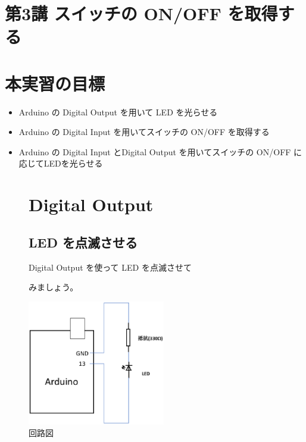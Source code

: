 \documentclass[11pt,a4paper]{jarticle}
\begin{document}
\section*{\LARGE{第3講 スイッチの ON/OFF を取得する}}
\section{本実習の目標}
\begin{itemize}
 \item Arduino の Digital Output を用いて LED を光らせる
 \item Arduino の Digital Input を用いてスイッチの ON/OFF を取得する
 \item Arduino の Digital Input とDigital Output を用いてスイッチの ON/OFF に応じてLEDを光らせる
\end{itemize}

\begin{figure}[h!]
 \begin{minipage}{0.5\columnwidth}
\section{Digital Output}
\subsection{LED を点滅させる}

Digital Output を使って LED を点滅させて

みましょう。
 \end{minipage}
 \begin{minipage}{0.5\columnwidth}
  \centering
  \includegraphics[width=60mm]{img/kairo2.eps}
  \caption{回路図}
 \end{minipage}
\end{figure}
\end{document}
